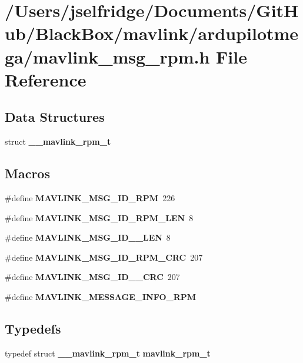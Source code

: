 \section{/\+Users/jselfridge/\+Documents/\+Git\+Hub/\+Black\+Box/mavlink/ardupilotmega/mavlink\+\_\+msg\+\_\+rpm.h File Reference}
\label{mavlink__msg__rpm_8h}
\subsection*{Data Structures}
\begin{DoxyCompactItemize}
\item 
struct \textbf{ \+\_\+\+\_\+mavlink\+\_\+rpm\+\_\+t}
\end{DoxyCompactItemize}
\subsection*{Macros}
\begin{DoxyCompactItemize}
\item 
\#define \textbf{ M\+A\+V\+L\+I\+N\+K\+\_\+\+M\+S\+G\+\_\+\+I\+D\+\_\+\+R\+PM}~226
\item 
\#define \textbf{ M\+A\+V\+L\+I\+N\+K\+\_\+\+M\+S\+G\+\_\+\+I\+D\+\_\+\+R\+P\+M\+\_\+\+L\+EN}~8
\item 
\#define \textbf{ M\+A\+V\+L\+I\+N\+K\+\_\+\+M\+S\+G\+\_\+\+I\+D\+\_\+\_\+\+L\+EN}~8
\item 
\#define \textbf{ M\+A\+V\+L\+I\+N\+K\+\_\+\+M\+S\+G\+\_\+\+I\+D\+\_\+\+R\+P\+M\+\_\+\+C\+RC}~207
\item 
\#define \textbf{ M\+A\+V\+L\+I\+N\+K\+\_\+\+M\+S\+G\+\_\+\+I\+D\+\_\+\_\+\+C\+RC}~207
\item 
\#define \textbf{ M\+A\+V\+L\+I\+N\+K\+\_\+\+M\+E\+S\+S\+A\+G\+E\+\_\+\+I\+N\+F\+O\+\_\+\+R\+PM}
\end{DoxyCompactItemize}
\subsection*{Typedefs}
\begin{DoxyCompactItemize}
\item 
typedef struct \textbf{ \+\_\+\+\_\+mavlink\+\_\+rpm\+\_\+t} \textbf{ mavlink\+\_\+rpm\+\_\+t}
\end{DoxyCompactItemize}


